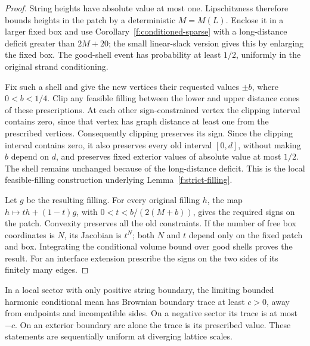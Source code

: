 \begin{proof}
String heights have absolute value at most one. Lipschitzness therefore
bounds heights in the patch by a deterministic \(M=M(L)\). Enclose it in
a larger fixed box and use Corollary~\ref{f:conditioned-sparse} with a long-distance
deficit greater than \(2M+20\); the small linear-slack version gives this
by enlarging the fixed box. The good-shell event has probability at least
\(1/2\), uniformly in the original strand conditioning.

Fix such a shell and give the new vertices their requested values
\(\pm b\), where \(0<b<1/4\). Clip any feasible filling between the lower
and upper distance cones of these prescriptions. At each other
sign-constrained vertex the clipping interval contains zero, since that
vertex has graph distance at least one from the prescribed vertices.
Consequently clipping preserves its sign. Since the clipping interval
contains zero, it also preserves every old interval \([0,d]\), without
making \(b\) depend on \(d\), and preserves
fixed exterior values of absolute value at most \(1/2\). The shell remains
unchanged because of the long-distance deficit. This is the local
feasible-filling construction underlying Lemma~\ref{f:strict-filling}.

Let \(g\) be the resulting filling. For every original filling \(h\), the
map \(h\mapsto t h+(1-t)g\), with
\(0<t<b/(2(M+b))\), gives the required signs on the patch.
Convexity preserves all the old constraints. If the number of free box
coordinates is \(N\), its Jacobian is \(t^N\); both \(N\) and \(t\) depend
only on the fixed patch and box. Integrating the conditional volume bound
over good shells proves the result. For an interface extension prescribe
the signs on the two sides of its finitely many edges.
\end{proof}

\begin{lemma}\label{g:sign-trace}
In a local sector with only positive string boundary, the limiting bounded
harmonic conditional mean has Brownian boundary trace at least \(c>0\),
away from endpoints and incompatible sides. On a negative sector its
trace is at most \(-c\). On an exterior boundary arc alone the trace is
its prescribed value. These statements are sequentially uniform at
diverging lattice scales.
\end{lemma}

